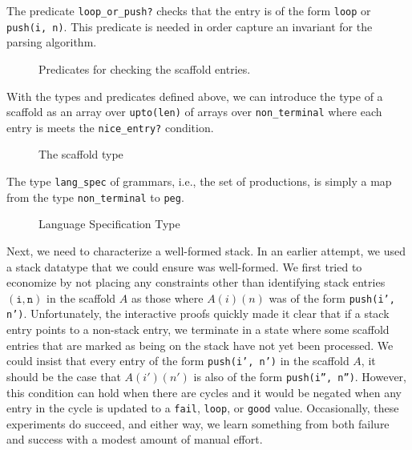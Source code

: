 \documentclass[sigplan,10pt,anonymous,review]{acmart}\settopmatter{printfolios=true,printccs=false,printacmref=false}
\begin{document}
\begin{CCSXML}
The predicate \texttt{loop\_or\_push?} checks that the entry is of the form
\texttt{loop} or \texttt{push(i, n)}\@.  This predicate is needed 
in order capture an invariant for the parsing algorithm.

\begin{figure}[h!]
  
    \vspace*{-4mm}
			\caption{Predicates for checking the scaffold entries.}
			\label{pvs:checkentry}
\end{figure}



With the types and predicates defined above, we can introduce the type of a
scaffold as an array over \texttt{upto(len)} of arrays over \texttt{non\_terminal}
where each entry is meets the \texttt{nice\_entry?} condition\@.  
\begin{figure}[h!]
  
    \vspace*{-4mm}
			\caption{The scaffold type}
			\label{pvs:scaffold}
\end{figure}

The type \texttt{lang\_spec} of grammars, i.e., the set of productions, is
simply a map from the type \texttt{non\_terminal} to \texttt{peg}\@.  
\begin{figure}[h!]
  
    \vspace*{-4mm}
			\caption{Language Specification Type}
			\label{pvs:grammar}
\end{figure}

Next, we need to characterize a well-formed stack.  In an earlier
attempt, we used a stack datatype that we could ensure was
well-formed.   We first tried to economize by not placing any
constraints other than identifying stack entries $(\mathtt{i, n})$ in the
scaffold $A$ as those where $A(i)(n)$ was of the form \texttt{push(i',
  n')}\@.  Unfortunately, the interactive proofs quickly made it clear that if a stack entry points
to a non-stack entry, we terminate in a state where some scaffold
entries that are marked as being on the stack have not yet been
processed.  We could insist that every entry of the form
\texttt{push(i', n')} in the scaffold $A$, it should be the case that
$A(i')(n')$ is also of the form \texttt{push(i'', n'')}.  However,
this condition can hold when there are cycles and it would be negated
when any entry in the cycle is updated to a \texttt{fail},
\texttt{loop}, or \texttt{good} value.  Occasionally, these
experiments do succeed, and either way, we learn something from both
failure and success with a modest amount of manual effort.


\end{CCSXML}
\end{document}
